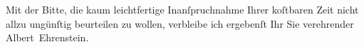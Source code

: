 \pstart
           Mit der Bitte, die kaum leichtfertige Inanſpruchnahme Ihrer koſtbaren Zeit nicht
               allzu ungünſtig beurteilen zu wollen, verbleibe ich ergebenſt Ihr Sie verehrender\pend
           \pstart \spacefill\mbox{Albert Ehrenstein.}\pend{}\endnumbering{}  
      